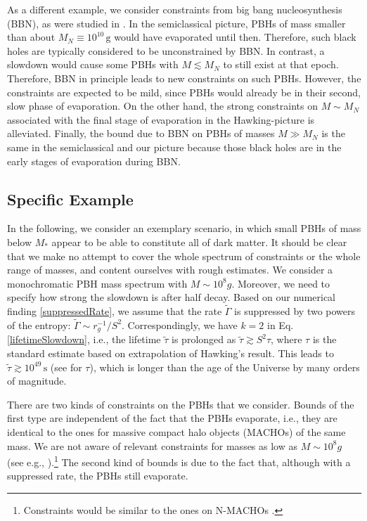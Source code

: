 \documentclass[aps,prd,reprint,superscriptaddress,nofootinbib]{revtex4-2}
\makeatletter
\newcommand*{\ie}{i.e., }
\newcommand*{\eg}{e.g., }
\newcommand*{\Eq}{Eq.\@\xspace}
\makeatother
\begin{document}
As a different example, we consider constraints from big bang nucleosynthesis (BBN), as were studied 
in \cite{0912.5297}. In the semiclassical picture, PBHs of mass smaller than about $M_N \equiv 10^{10}\,\text{g}$ would have evaporated until then. Therefore, such black holes are typically considered to be unconstrained by BBN. In contrast, a slowdown would cause some PBHs with $M \lesssim M_N$ to still exist at that epoch. Therefore, BBN in principle leads to 
new constraints on such PBHs.
However, the constraints are expected to be mild, since PBHs would already be in their second, slow phase of evaporation.  On the other hand, the strong constraints on  $M \sim M_N$ associated with the final stage of evaporation in the Hawking-picture is alleviated. Finally, the bound due to 
BBN on PBHs of masses $M \gg M_N$ is the same in the semiclassical and our picture because those black holes are in the early stages of evaporation during BBN. 

\subsection{Specific Example}

In the following, we consider an exemplary scenario, in which small PBHs of mass below $M_*$ appear to be able to constitute all of dark matter. 
It should be clear that we make no attempt to cover the whole spectrum of 
constraints or the whole range of masses, and content ourselves with rough estimates.
We consider a monochromatic PBH mass spectrum with $M \sim 10^8 g$. Moreover, we need to specify how strong the slowdown is after half decay. Based on our numerical finding \eqref{suppressedRate}, we assume that the rate $\tilde{\Gamma}$ is suppressed by two powers of the entropy: $\tilde{\Gamma} \sim r_g^{-1}/S^2$. Correspondingly, we have $k=2$ in \Eq \eqref{lifetimeSlowdown}, \ie the lifetime $\tilde{\tau}$ is prolonged as $\tilde{\tau} \gtrsim S^2 \tau$, where $\tau$ is the 
 standard estimate based on extrapolation of 
Hawking's result.
This leads to $\tilde{\tau}\gtrsim 10^{49}\,\text{s}$ (see \cite{2002.12778} for $\tau$), which is longer than the age of the Universe by many orders of magnitude. 

There are two kinds of constraints on the PBHs that we consider. Bounds of the first type are independent of the fact that the PBHs evaporate, \ie 
they are identical to the ones for massive compact halo objects (MACHOs) of the same mass. We are not aware of relevant constraints for masses as low as $M \sim 10^8 g$ (see \eg 
\cite{2002.12778, astro-ph/9803082}).\footnote{Constraints would be similar to the ones on N-MACHOs \cite{1911.13281}.} The second kind of bounds is due to the fact that, although with a suppressed rate, the PBHs still evaporate. 
\end{document}
